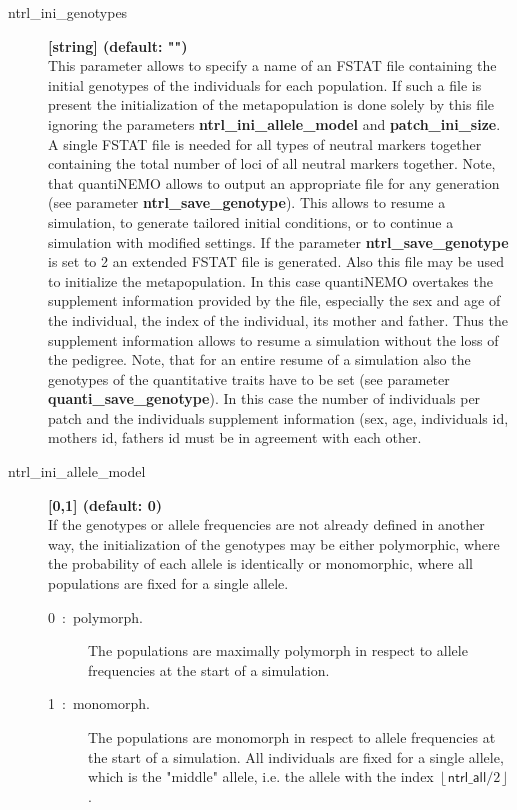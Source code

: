 \documentclass[letterpaper,12pt,oneside]{book}
\begin{document}
\begin{description}
\item[ntrl\_ini\_genotypes] \textbf{[string] (default: "")}\\
This parameter allows to specify a name of an FSTAT file \citep{Goudet_1995} containing the initial genotypes of the individuals for each population. If such a file is present the initialization of the metapopulation is done solely by this file ignoring the parameters \textbf{ntrl\_ini\_allele\_model} and \textbf{patch\_ini\_size}. A single FSTAT file is needed for all types of neutral markers together containing the total number of loci of all neutral markers together. Note, that quantiNEMO allows to output an appropriate file for any generation (see parameter \textbf{ntrl\_save\_genotype}). This allows to resume a simulation, to generate tailored initial conditions, or to continue a simulation with modified settings. If the parameter \textbf{ntrl\_save\_genotype} is set to 2 an extended FSTAT file is generated. Also this file may be used to initialize the metapopulation. In this case quantiNEMO overtakes the supplement information provided by the file, especially the sex and age of the individual, the index of the individual, its mother and father. Thus the supplement information allows to resume a simulation without the loss of the pedigree. Note, that for an entire resume of a simulation also the genotypes of the quantitative traits have to be set (see parameter \textbf{quanti\_save\_genotype}). In this case the number of individuals per patch and the individuals supplement information (sex, age, individuals id, mothers id, fathers id must be in agreement with each other. 

\item[ntrl\_ini\_allele\_model] \textbf{[0,1] (default: 0)}\\
If the genotypes or allele frequencies are not already defined in another way, the initialization of the genotypes may be either polymorphic, where the probability of each allele is identically or monomorphic, where all populations are fixed for a single allele.   
\begin{description}
\item[0~:~polymorph.] The populations are maximally polymorph in respect to allele frequencies at the start of a simulation.
\item[1~:~monomorph.] The populations are monomorph in respect to allele frequencies at the start of a simulation. All individuals are fixed for a single allele, which is  the "middle" allele, i.e. the allele with the index $\left\lfloor \textsf{ntrl\_all}/2\right\rfloor$.
\end{description}
\end{description}
\end{document}
